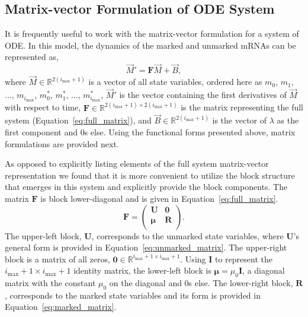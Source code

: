 \documentclass[review]{elsarticle}
\newcommand{\imax}{\ensuremath{i_{\max}}\xspace}
\let\bs\boldsymbol
\begin{document}
\subsection{Matrix-vector Formulation of ODE System}
It is frequently useful to work with the matrix-vector formulation for a system of ODE.
In this model, the dynamics of the marked and unmarked mRNAs can be represented as,
\begin{equation}\label{eq:matrix_full}\vec{M}'=\boldsymbol{F}\vec{M}+\vec{B},
\end{equation} 
where $\vec{M}\in\mathbb{R}^{2(\imax+1)}$ is a vector of all state variables, ordered here as $m_0$, $m_1$, ..., $m_{\imax}$, $m^*_0$, $m^*_1$, ..., $m^*_{\imax}$, $\vec{M}'$ is the vector containing the first derivatives of $\vec{M}$ with respect to time, $\bs{F}\in\mathbb{R}^{2(\imax+1)\times 2(\imax+1)}$ is the matrix representing the full system (Equation~\ref{eq:full_matrix}), and $\vec{B}\in\mathbb{R}^{2(\imax+1)}$ is the vector of $\lambda$ as the first component and 0s else.
Using the functional forms presented above, matrix formulations are provided next.

As opposed to explicitly listing elements of the full system matrix-vector representation we found that it is more convenient to utilize the block structure that emerges in this system and explicitly provide the block components.
The matrix $\bs{F}$ is block lower-diagonal and is given in Equation~\ref{eq:full_matrix}.
\begin{equation}
\label{eq:full_matrix}
\bs{F}=\left(\begin{array}{cc}
\bs{U} & \bs{0} \\
\bs{\mu} & \bs{R} \\
\end{array} \right).
\end{equation}
The upper-left block, $\bs{U}$, corresponds to the unmarked state variables, where $\bs{U}$'s general form is provided in Equation~\ref{eq:unmarked_matrix}.
The upper-right block is a matrix of all zeros, $\bs{0}\in\mathbb{R}^{\imax+1\times \imax+1}$.
Using $\bs{I}$ to represent the $\imax+1\times \imax+1$ identity matrix, the lower-left block is $\bs{\mu}=\mu_0\bs{I}$, a diagonal matrix with the constant $\mu_0$ on the diagonal and 0s else.
The lower-right block, $\bs{R}$, corresponds to the marked state variables and its form is provided in Equation~\ref{eq:marked_matrix}.
\end{document}
